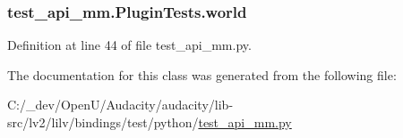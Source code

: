 \subsubsection[{\texorpdfstring{world}{world}}]{\setlength{\rightskip}{0pt plus 5cm}test\+\_\+api\+\_\+mm.\+Plugin\+Tests.\+world}\hypertarget{classtest__api__mm_1_1_plugin_tests_a777c895784d917e44edd8cae11bb8bce}{}\label{classtest__api__mm_1_1_plugin_tests_a777c895784d917e44edd8cae11bb8bce}


Definition at line 44 of file test\+\_\+api\+\_\+mm.\+py.



The documentation for this class was generated from the following file\+:\begin{DoxyCompactItemize}
\item 
C\+:/\+\_\+dev/\+Open\+U/\+Audacity/audacity/lib-\/src/lv2/lilv/bindings/test/python/\hyperlink{test__api__mm_8py}{test\+\_\+api\+\_\+mm.\+py}\end{DoxyCompactItemize}
